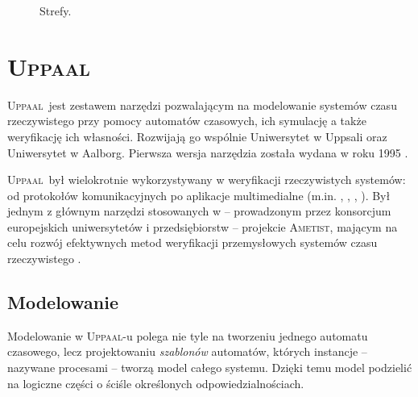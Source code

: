 \documentclass{pracamgr}
\newcommand{\upp}{\textsc{Uppaal}}
\theoremstyle{plain}
\begin{document}
\begin{figure}
  \centering
   \hspace{1cm}
  \caption{Strefy.}
  \label{img:zones}
\end{figure}

\section{\upp}
\label{uppaal}

\upp\ jest zestawem narzędzi pozwalającym na modelowanie systemów czasu
rzeczywistego przy pomocy automatów czasowych, ich symulację a także
weryfikację ich własności. Rozwijają go wspólnie Uniwersytet w Uppsali
oraz Uniwersytet w Aalborg. Pierwsza wersja narzędzia została wydana w roku
1995 \cite{lpw:fct95}.

\upp\ był wielokrotnie wykorzystywany w weryfikacji rzeczywistych
systemów: od protokołów komunikacyjnych po aplikacje multimedialne
(m.in. \cite{lp:prfts97}, \cite{lpw:tacas98},
\cite{DBLP:conf/icfem/BordbarO03},
\cite{Ravn:2011:MVW:1987389.1987431}). Był jednym z głównym narzędzi
stosowanych w -- prowadzonym przez konsorcjum europejskich
uniwersytetów i przedsiębiorstw -- projekcie \textsc{Ametist}, mającym
na celu rozwój efektywnych metod weryfikacji przemysłowych systemów czasu
rzeczywistego \cite{AMETISTfinal}.

\subsection{Modelowanie}
Modelowanie w \upp-u polega nie tyle na tworzeniu jednego automatu
czasowego, lecz projektowaniu \emph{szablonów} automatów, których
instancje -- nazywane procesami -- tworzą model całego systemu. Dzięki
temu model podzielić na logiczne części o ściśle określonych
odpowiedzialnościach.
\end{document}

